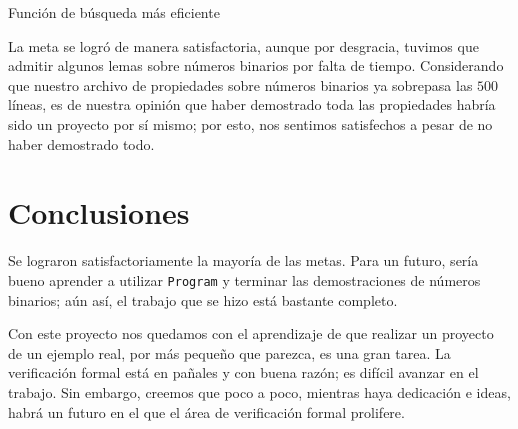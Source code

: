 \documentclass[11pt,letterpaper]{article}
\begin{document}
  \begin{listing}[H]
  \inputminted{coq}{src/lookup2.v}
  \caption{Función de búsqueda más eficiente}
  \label{lst:lookup2}
\end{listing}


  La meta se logró de manera satisfactoria, aunque por desgracia, tuvimos que admitir algunos lemas sobre números binarios por falta de tiempo. Considerando que nuestro archivo de propiedades sobre números binarios ya sobrepasa las $500$ líneas, es de nuestra opinión que haber demostrado toda las propiedades habría sido un proyecto por sí mismo; por esto, nos sentimos satisfechos a pesar de no haber demostrado todo.

  \section{Conclusiones}
  \noindent Se lograron satisfactoriamente la mayoría de las metas. Para un futuro, sería bueno aprender a utilizar \texttt{Program} y terminar las demostraciones de números binarios; aún así, el trabajo que se hizo está bastante completo.

  Con este proyecto nos quedamos con el aprendizaje de que realizar un proyecto de un ejemplo real, por más pequeño que parezca, es una gran tarea. La verificación formal está en pañales y con buena razón; es difícil avanzar en el trabajo. Sin embargo, creemos que poco a poco, mientras haya dedicación e ideas, habrá un futuro en el que el área de verificación formal prolifere.

\nocite{*}
 
 
 
\end{document}

